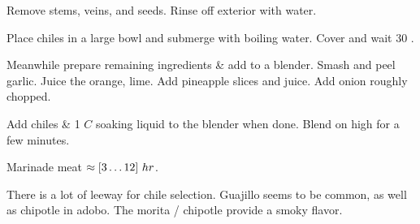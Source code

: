 \begin{preparation}
\item Remove stems, veins, and seeds.
	Rinse off exterior with water.

\item Place chiles in a large bowl and submerge with boiling water.
	Cover and wait 30 \minute.

\item Meanwhile prepare remaining ingredients \& add to a blender.
	Smash and peel garlic.
	Juice the orange, lime.
	Add pineapple slices and juice.
	Add onion roughly chopped.

\item Add chiles \& 1 $C$ soaking liquid to the blender when done.
	Blend on high for a few minutes.

\item Marinade meat $\approx[3\ldots12]~\hour$.
\end{preparation}


\begin{variation}
\item There is a lot of leeway for chile selection.
	Guajillo seems to be common, as well as chipotle in adobo.
	The morita / chipotle provide a smoky flavor.
\end{variation}


\recipeend

